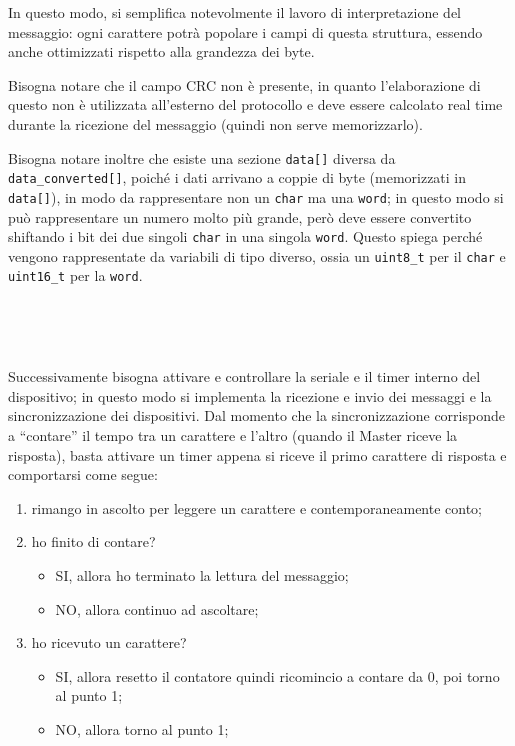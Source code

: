 \documentclass[a4paper,titlepage]{book}
\newcommand{\itema}{\begin{itemize}[noitemsep,topsep=10pt,parsep=5pt,partopsep=10pt]}
\newcommand{\code}{\lstinline}
\begin{document}
In questo modo, si semplifica notevolmente il lavoro di interpretazione del messaggio: ogni carattere potrà popolare i campi di questa struttura, essendo anche ottimizzati rispetto alla grandezza dei byte. 

Bisogna notare che il campo CRC non è presente, in quanto l'elaborazione di questo non è utilizzata all'esterno del protocollo e deve essere calcolato real time durante la ricezione del messaggio (quindi non serve memorizzarlo).

Bisogna notare inoltre che esiste una sezione \code!data[]! diversa da \code!data_converted[]!, poiché i dati arrivano a coppie di byte (memorizzati in \code!data[]!), in modo da rappresentare non un \code!char! ma una \code!word!; in questo modo si può rappresentare un numero molto più grande, però deve essere convertito shiftando i bit dei due singoli \code!char! in una singola \code!word!. Questo spiega perché vengono rappresentate da variabili di tipo diverso, ossia un \code!uint8_t! per il \code!char! e \code!uint16_t! per la \code!word!.

~

~

Successivamente bisogna attivare e controllare la seriale e il timer interno del dispositivo; in questo modo si implementa la ricezione e invio dei messaggi e la sincronizzazione dei dispositivi. Dal momento che la sincronizzazione corrisponde a ``contare'' il tempo tra un carattere e l'altro (quando il Master riceve la risposta), basta attivare un timer appena si riceve il primo carattere di risposta e comportarsi come segue:

\begin{enumerate}[noitemsep,topsep=15pt,parsep=6pt,partopsep=0pt]

\item rimango in ascolto per leggere un carattere e contemporaneamente conto;
\item ho finito di contare?
	\itema
	\item SI, allora ho terminato la lettura del messaggio;
	\item NO, allora continuo ad ascoltare;
	\end{itemize}
\item ho ricevuto un carattere?
	\itema
	\item SI, allora resetto il contatore quindi ricomincio a contare da 0, poi torno al punto 1;
	\item NO, allora torno al punto 1;
	\end{itemize}

\end{enumerate}
\end{document}

